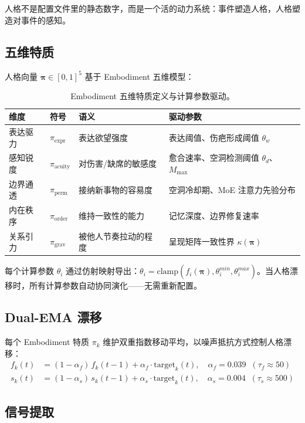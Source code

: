 \documentclass[11pt]{article}
\begin{document}
人格不是配置文件里的静态数字，而是一个活的动力系统：事件塑造人格，人格塑造对事件的感知。

\subsection{五维特质}

人格向量 $\boldsymbol{\pi} \in [0,1]^5$ 基于 Embodiment 五维模型：

\begin{table}[H]
\centering
\caption{Embodiment 五维特质定义与计算参数驱动。}
\label{tab:traits}
\begin{tabular}{lllp{5.5cm}}
\toprule
\textbf{维度} & \textbf{符号} & \textbf{语义} & \textbf{驱动参数} \\
\midrule
表达驱力 & $\pi_{\text{expr}}$ & 表达欲望强度 & 表达阈值、伤疤形成阈值 $\theta_w$ \\
感知锐度 & $\pi_{\text{acuity}}$ & 对伤害/缺席的敏感度 & 愈合速率、空洞检测阈值 $\theta_d$、$M_{\max}$ \\
边界通透 & $\pi_{\text{perm}}$ & 接纳新事物的容易度 & 空洞冷却期、MoE 注意力先验分布 \\
内在秩序 & $\pi_{\text{order}}$ & 维持一致性的能力 & 记忆深度、边界修复速率 \\
关系引力 & $\pi_{\text{grav}}$ & 被他人节奏拉动的程度 & 呈现矩阵一致性界 $\kappa(\boldsymbol{\pi})$ \\
\bottomrule
\end{tabular}
\end{table}

每个计算参数 $\theta_i$ 通过仿射映射导出：$\theta_i = \text{clamp}(f_i(\boldsymbol{\pi}), \theta_i^{min}, \theta_i^{max})$。当人格漂移时，所有计算参数自动协同演化——无需重新配置。

\subsection{Dual-EMA 漂移}

每个 Embodiment 特质 $\pi_k$ 维护双重指数移动平均，以噪声抵抗方式控制人格漂移：
\begin{align}
f_k(t) &= (1 - \alpha_f)\, f_k(t-1) + \alpha_f \cdot \text{target}_k(t), \quad \alpha_f = 0.039 \;\;(\tau_f \approx 50) \\
s_k(t) &= (1 - \alpha_s)\, s_k(t-1) + \alpha_s \cdot \text{target}_k(t), \quad \alpha_s = 0.004 \;\;(\tau_s \approx 500)
\end{align}

\subsection{信号提取}
\end{document}

